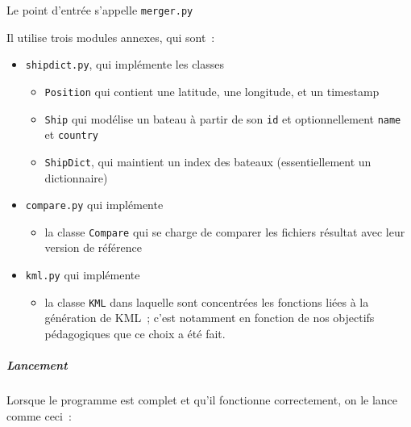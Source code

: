     Le point d'entrée s'appelle \texttt{merger.py}

Il utilise trois modules annexes, qui sont~:

\begin{itemize}
\tightlist
\item
  \texttt{shipdict.py}, qui implémente les classes

  \begin{itemize}
  \tightlist
  \item
    \texttt{Position} qui contient une latitude, une longitude, et un
    timestamp
  \item
    \texttt{Ship} qui modélise un bateau à partir de son \texttt{id} et
    optionnellement \texttt{name} et \texttt{country}
  \item
    \texttt{ShipDict}, qui maintient un index des bateaux
    (essentiellement un dictionnaire)
  \end{itemize}
\item
  \texttt{compare.py} qui implémente

  \begin{itemize}
  \tightlist
  \item
    la classe \texttt{Compare} qui se charge de comparer les fichiers
    résultat avec leur version de référence
  \end{itemize}
\item
  \texttt{kml.py} qui implémente

  \begin{itemize}
  \tightlist
  \item
    la classe \texttt{KML} dans laquelle sont concentrées les fonctions
    liées à la génération de KML~; c'est notamment en fonction de nos
    objectifs pédagogiques que ce choix a été fait.
  \end{itemize}
\end{itemize}

    \hypertarget{lancement}{%
\subparagraph{Lancement}\label{lancement}}

    Lorsque le programme est complet et qu'il fonctionne correctement, on le
lance comme ceci~:

\begin{Shaded}
\begin{Highlighting}[frame=lines,framerule=0.6mm,rulecolor=\color{asisframecolor}]
\NormalTok{$ }
\OperatorTok{>}
\OperatorTok{>}
\end{Highlighting}
\end{Shaded}

